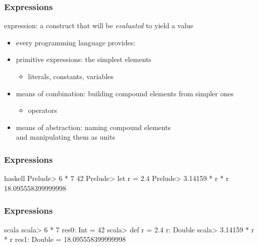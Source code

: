 \documentclass[dvipsnames]{beamer}
\theoremstyle{plain}
\begin{document}
\begin{frame}
  \frametitle{Expressions}

  \begin{definition}
    \alert{expression}: a construct that will be \emph{evaluated} to yield a value
  \end{definition}

  \pause
  \medskip
  \begin{itemize}
    \item every programming language provides:

    \medskip
    \item primitive expressions: the simplest elements\\
    \begin{itemize}
      \item literals, constants, variables
    \end{itemize}
    \item means of combination: building compound elements from simpler ones\\
    \begin{itemize}
      \item operators
    \end{itemize}
    \item means of abstraction: naming compound elements\\
      and manipulating them as units
  \end{itemize}
\end{frame}

\begin{frame}[fragile]
  \frametitle{Expressions}

  \begin{example}[Haskell]
    \begin{pygments}{haskell}
Prelude> 6 * 7
42
Prelude> let r = 2.4
Prelude> 3.14159 * r * r
18.095558399999998
    \end{pygments}
  \end{example}
\end{frame}

\begin{frame}[fragile]
  \frametitle{Expressions}

  \begin{example}[Scala]
    \begin{pygments}{scala}
scala> 6 * 7
res0: Int = 42
scala> def r = 2.4
r: Double
scala> 3.14159 * r * r
res1: Double = 18.095558399999998
    \end{pygments}
  \end{example}
\end{frame}
\end{document}
